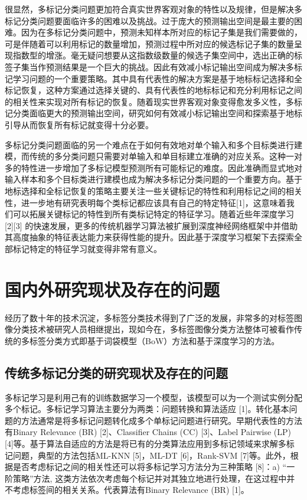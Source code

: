很显然，多标记分类问题更加符合真实世界客观对象的特性以及规律，但是解决多标记分类问题要面临许多的困难以及挑战。过于庞大的预测输出空间是最主要的困难。因为在多标记分类问题中，预测未知样本所对应的标记子集是我们需要做的，可是伴随着可以利用标记的数量增加，预测过程中所对应的候选标记子集的数量呈现指数型的增涨。毫无疑问想要从这指数级数量的候选子集空间中，选出正确的标签子集当作预测结果是一个巨大的挑战。因此有效减小标记输出空间成为解决多标记学习问题的一个重要策略。其中具有代表性的解决方案是基于地标标记选择和全标记恢复，这种方案通过选择关键的、具有代表性的地标标记和充分利用标记之间的相关性来实现对所有标记的恢复。随着现实世界客观对象变得愈发多义性，多标记分类面临更大的预测输出空间，研究如何有效减小标记输出空间和探索基于地标引导从而恢复所有标记就变得十分必要。

多标记分类问题面临的另一个难点在于如何有效地对单个输入和多个目标类进行建模，而传统的多分类问题只需要对单输入和单目标建立准确的对应关系。这种一对多的特性进一步增加了多标记模型预测所有可能标记的难度。因此准确而显式地对输入样本和多个目标类进行建模也成为解决多标记分类问题的一个重要方向。基于地标选择和全标记恢复的策略主要关注一些关键标记的特性和利用标记之间的相关性，进一步地有研究表明每个类标记都应该具有自己的特定特征[1]，这意味着我们可以拓展关键标记的特性到所有类标记特定的特征学习。随着近些年深度学习[2][3] 的快速发展，更多的传统机器学习算法被扩展到深度神经网络框架中并借助其高度抽象的特征表达能力来获得性能的提升。因此基于深度学习框架下去探索全部标记特定的特征学习就变得非常有意义。

\section{国内外研究现状及存在的问题}
经历了数十年的技术沉淀，多标签分类技术得到了广泛的发展，非常多的对标签图像分类技术被研究人员相继提出，现如今在，多标签图像分类方法整体可被看作传统的多标签分类方式即基于词袋模型（BoW）方法和基于深度学习的方法。

\subsection{传统多标记分类的研究现状及存在的问题}
多标记学习是利用己有的训练数据学习一个模型，该模型可以为一个测试实例分配多个标记。多标记学习算法主要分为两类：问题转换和算法适应 [1]。转化基本问题的方法通常是将多标记问题转化成多个单标记问题进行研究。早期代表性的方法有Binary Relevance (BR) [2]、Classifier Chains (CC) [3]、Label Pairwise (LP) [4]等。基于算法自适应的方法是将已有的分类算法应用到多标记领域来求解多标记问题，典型的方法包括ML-KNN [5]，ML-DT [6]，Rank-SVM [7]等。此外，根据是否考虑标记之间的相关性还可以将多标记学习方法分为三种策略 [8]：a) “一阶策略”方法, 这类方法依次考虑每个标记并对其独立地进行处理，在这过程中并不考虑标签间的相关关系。代表算法有Binary Relevance (BR) [1]。

